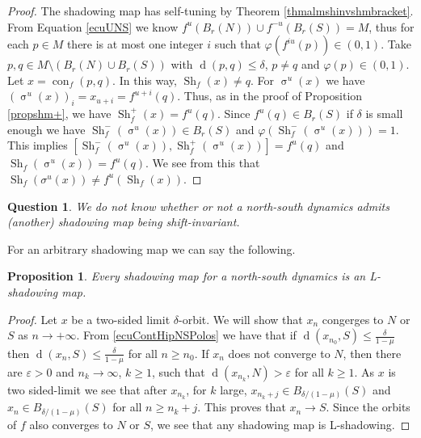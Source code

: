 \documentclass[12pt]{amsart}
\DeclareMathOperator{\shift}{\sigma}
\theoremstyle{plain}
\newtheorem{prop}[thm]{Proposition}
\newtheorem{que}[thm]{Question}
\theoremstyle{definition}
\theoremstyle{remark}
\DeclareMathOperator{\dist}{d}
\DeclareMathOperator{\con}{con}
\DeclareMathOperator{\shm}{Sh}
\renewcommand{\epsilon}{\varepsilon}
\newcommand{\azul}[1]{\textcolor{blue}{#1}}
\begin{document}
\begin{proof}
The shadowing map has self-tuning by Theorem \ref{thmalmshinvshmbracket}.
From Equation \eqref{ecuUNS} we know $f^u(B_r(N))\cup f^{-u}(B_r(S))=M$, thus for each $p\in M$ there is at most one integer $i$ such that $\varphi(f^{iu}(p))\in(0,1)$.
	Take $p,q\in M\setminus (B_r(N)\cup B_r(S))$ with $\dist(p,q)\leq \delta$, $p\neq q$ and $\varphi(p)\in(0,1)$.
	Let $x=\con_f(p,q)$.
	In this way, $\shm_f(x)\neq q$.
For $\shift^u(x)$
	we have $(\shift^u(x))_i=x_{u+i}=f^{u+i}(q)$.
	Thus, as in the proof of Proposition \ref{propshm+}, we have $\shm_f^+(x)=f^u(q)$.
Since $f^u(q)\in B_r(S)$ if $\delta$ is small enough we have
$\shm^{-}_f(\shift^u(x))\in B_r(S)$ and
$\varphi(\shm^{-}_f(\shift^u(x)))=1$.
This implies $[\shm^{-}_f(\shift^u(x)),\shm^{+}_f(\shift^u(x))]=f^u(q)$ and
$\shm_f(\shift^u(x))=f^u(q)$. We see from this that $\shm_f(\sigma^u(x))\neq f^u(\shm_f(x))$.
\end{proof}

\begin{que}
We do not know whether or not a north-south dynamics admits (another) shadowing map being shift-invariant.
\end{que}

For an arbitrary shadowing map we can say the following.

\begin{prop}
	Every shadowing map for a north-south dynamics is an
	L-shadowing map.
\end{prop}

\begin{proof}
	Let $x$ be a two-sided limit $\delta$-orbit.
	We will show that $x_n$ congerges to $N$ or $S$ as $n\to+\infty$.
	From \eqref{ecuContHipNSPolos} we have that
	if $\dist(x_{n_0},S)\leq \frac{\delta}{1-\mu}$ then
	$\dist(x_{n},S)\leq \frac{\delta}{1-\mu}$ for all $n\geq n_0$.
	If $x_n$ does not converge to $N$, then there are $\epsilon>0$ and $n_k\to\infty$, $k\geq 1$, such that $\dist(x_{n_k},N)>\epsilon$ for all $k\geq 1$.
	As $x$ is two sided-limit we see that after $x_{n_k}$, for $k$ large,
	$x_{n_k+j}\in B_{\delta/(1-\mu)}(S)$ and
	$x_{n}\in B_{\delta/(1-\mu)}(S)$ for all $n\geq n_k+j$.
	This proves that $x_n\to S$.
	Since the orbits of $f$ also converges to $N$ or $S$, we see that any shadowing map is L-shadowing.
\end{proof}
\end{document}
